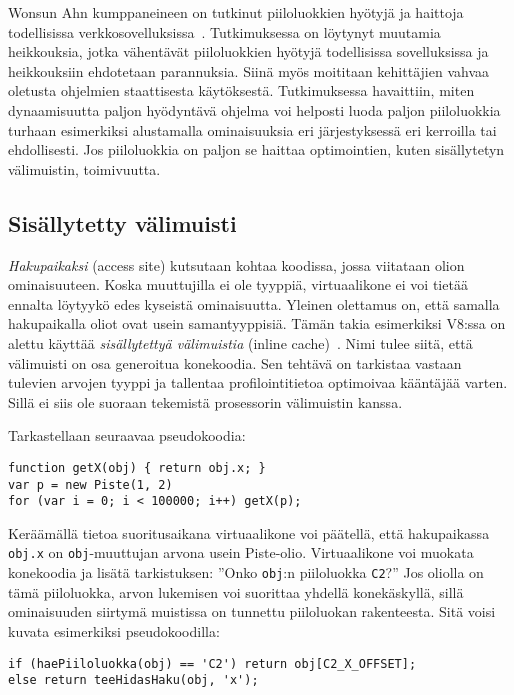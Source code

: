 Wonsun Ahn kumppaneineen on tutkinut piiloluokkien hyötyjä ja haittoja todellisissa verkkosovelluksissa~\cite{Ahn2014}. Tutkimuksessa on löytynyt muutamia heikkouksia, jotka vähentävät piiloluokkien hyötyjä todellisissa sovelluksissa ja heikkouksiin ehdotetaan parannuksia. Siinä myös moititaan kehittäjien vahvaa oletusta ohjelmien staattisesta käytöksestä. Tutkimuksessa havaittiin, miten dynaamisuutta paljon hyödyntävä ohjelma voi helposti luoda paljon piiloluokkia turhaan esimerkiksi alustamalla ominaisuuksia eri järjestyksessä eri kerroilla tai ehdollisesti. Jos piiloluokkia on paljon se haittaa optimointien, kuten sisällytetyn välimuistin, toimivuutta.

\subsection{Sisällytetty välimuisti}

\textit{Hakupaikaksi} (access site) kutsutaan kohtaa koodissa, jossa viitataan olion ominaisuuteen. Koska muuttujilla ei ole tyyppiä, virtuaalikone ei voi tietää ennalta löytyykö edes kyseistä ominaisuutta. Yleinen olettamus on, että samalla hakupaikalla oliot ovat usein samantyyppisiä. Tämän takia esimerkiksi V8:ssa on alettu käyttää \textit{sisällytettyä välimuistia} (inline cache)~\cite[s.~498]{Ahn2014}. Nimi tulee siitä, että välimuisti on osa generoitua konekoodia. Sen tehtävä on tarkistaa vastaan tulevien arvojen tyyppi ja tallentaa profilointitietoa optimoivaa kääntäjää varten. Sillä ei siis ole suoraan tekemistä prosessorin välimuistin kanssa.

Tarkastellaan seuraavaa pseudokoodia:
\begin{lstlisting}
function getX(obj) { return obj.x; }
var p = new Piste(1, 2)
for (var i = 0; i < 100000; i++) getX(p);
\end{lstlisting}
Keräämällä tietoa suoritusaikana virtuaalikone voi päätellä, että hakupaikassa \texttt{obj.x} on \texttt{obj}-muuttujan arvona usein Piste-olio. Virtuaalikone voi muokata konekoodia ja lisätä tarkistuksen: ''Onko \texttt{obj}:n piiloluokka \texttt{C2}?'' Jos oliolla on tämä piiloluokka, arvon lukemisen voi suorittaa yhdellä konekäskyllä, sillä ominaisuuden siirtymä muistissa on tunnettu piiloluokan rakenteesta. Sitä voisi kuvata esimerkiksi pseudokoodilla:
\begin{lstlisting}
if (haePiiloluokka(obj) == 'C2') return obj[C2_X_OFFSET];
else return teeHidasHaku(obj, 'x');
\end{lstlisting}

